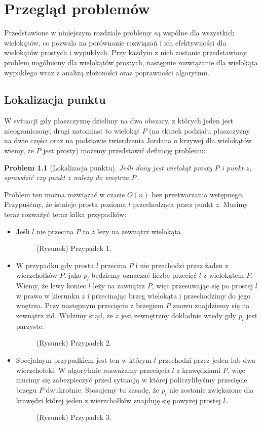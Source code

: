 \documentclass[12pt,oneside,brudnopis]{xelatex-mgr/xmgr}
\newtheorem{problem}{Problem}
\begin{document}
\chapter{Przegląd problemów}
Przedstawione w niniejszym rozdziale problemy są wspólne dla
wszystkich wielokątów, co pozwala na porównanie rozwiązań i ich
efektywności dla wielokątów prostych i wypukłych. Przy każdym z nich
zostanie przedstawiony problem uogólniony dla wielokątów prostych,
następnie rozwiązanie dla wielokąta wypukłego wraz z analizą
złożoności oraz poprawności algorytmu.

\section{Lokalizacja punktu}
W sytuacji gdy płaszczyznę dzielimy na dwa obszary, z których jeden
jest nieograniczony, drugi natomiast to wielokąt $P$ (na skutek
podziału płaszczyzny na dwie części oraz na podstawie twierdzenia
Jordana o krzywej dla wielokątów wiemy, że $P$ jest prosty) możemy
przedstawić definicję problemu:

\begin{problem}[Lokalizacja punktu]
  Jeśli dany jest wielokąt prosty $P$ i punkt $z$, sprawdzić czy punkt $z$
  należy do wnętrza $P$.
\end{problem}

Problem ten można rozwiązać w czasie $O(n)$ bez przetwarzania
wstępnego. Przypuśćmy, że istnieje prosta pozioma $l$ przechodząca
przez punkt $z$. Musimy teraz rozważyć teraz kilka przypadków:

\begin{itemize}
\item Jeśli $l$ nie przecina $P$ to $z$ leży na zewnątrz wielokąta.
  \begin{figure}[htp]
    \centering
    \caption{(Rysunek) Przypadek 1.}
  \end{figure}
\item W przypadku gdy prosta $l$ przecina $P$ i nie przechodzi przez
  żaden z wierzchołków $P$, jako $p_l$ będziemy oznaczać liczbę
  przecięć $l$ z wielokątem $P$. Wiemy, że lewy koniec $l$ leży na
  zawnątrz $P$, więc przesuwając się po prostej $l$ w prawo w kierunku
  $z$ i przecinając brzeg wielokąta i przechodzimy do jego
  wnętrza. Przy następnym przecięciu z brzegiem $P$ znowu znajdziemy
  się na zewnątrz itd. Widzimy stąd, że $z$ jest zewnętrzny dokładnie
  wtedy gdy $p_l$ jest parzyste.
  \begin{figure}[htp]
    \centering
    \caption{(Rysunek) Przypadek 2.}
  \end{figure}
\item Specjalnym przypadkiem jest ten w którym $l$ przechodzi przez
  jeden lub dwa wierzchołeki. W algorytmie rozważamy przecięcia $l$ z
  krawędziami $P$, więc musimy się zabezpieczyć przed sytuacją w
  której policzylibyśmy przecięcie brzegu $P$ dwukrotnie. Stosujemy tu
  zasadę, że $p_l$ nie zostanie zwiększone dla krawędzi której jeden z
  wierzchołków znajduję się powyżej prostej $l$.
  \begin{figure}[htp]
    \centering
    \caption{(Rysunek) Przypadek 3.}
  \end{figure}
\end{itemize}
\end{document}
